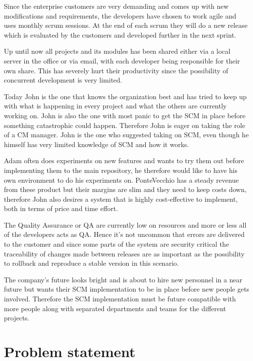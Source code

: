 \documentclass[10pt]{article}
\begin{document}
\noindent Since the enterprise customers are very demanding and comes up with new modifications and requirements, the developers have chosen to work agile and uses monthly scrum sessions. At the end of each scrum they will do a new release which is evaluated by the customers and developed further in the next sprint.

\noindent Up until now all projects and its modules has been shared either via a local server in the office or via email, with each developer being responsible for their own share. This has severely hurt their productivity since the possibility of concurrent development is very limited. 

\noindent Today John is the one that knows the organization best and has tried to keep up with what is happening in every project and what the others are currently working on. John is also the one with most panic to get the SCM in place before something catastrophic could happen. Therefore John is eager on taking the role of a CM manager. John is the one who suggested taking on SCM, even though he himself has very limited knowledge of SCM and how it works.

\noindent Adam often does experiments on new features and wants to try them out before implementing them to the main repository, he therefore would like to have his own environment to do his experiments on. PonteVecchio has a steady revenue from these product but their margins are slim and they need to keep costs down, therefore John also desires a system that is highly cost-effective to implement, both in terms of price and time effort. 

\noindent The Quality Assurance or QA are currently low on resources and more or less all of the developers acts as QA. Hence it’s not uncommon that errors are delivered to the customer and since some parts of the system are security critical the traceability of changes made between releases are as important as the possibility to rollback and reproduce a stable version in this scenario.

\noindent The company's future looks bright and is about to hire new personnel in a near future but wants their SCM implementation to be in place before new people gets involved. Therefore the SCM implementation must be future compatible with more people along with separated departments and teams for the different projects.

\section{Problem statement}
\end{document}
